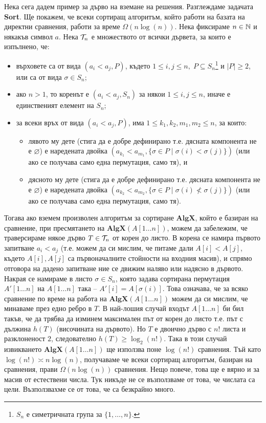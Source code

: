 Нека сега дадем пример за дърво на вземане на решения.
Разглеждаме задачата \textbf{Sort}.
Ще покажем, че всеки сортиращ алгоритъм, който работи на базата на директни сравнения, работи за време $\Omega(n \log (n))$.
Нека фиксираме $n \in \mathbb{N}$ и някакъв символ $a$.
Нека $\mathcal{T}_n$ е множеството от всички дървета, за които е изпълнено, че:
\begin{itemize}
    \item върховете са от вида $(a_i < a_j, P)$, където $1 \leq i, j \leq n, \; P \subseteq S_n$\footnote{$S_n$ е симетричната група за $\{ 1, \dots, n \}$.} и $|P| \geq 2$, или са от вида $\sigma \in S_n$;
    \item ако $n > 1$, то коренът е $(a_i < a_j, S_n)$ за някои $1 \leq i, j \leq n$, иначе е единственият елемент на $S_n$;
    \item за всеки връх от вида $(a_i < a_j, P)$, има $1 \leq k_1, k_2, m_1, m_2 \leq n$, за които:
          \begin{itemize}
              \item лявото му дете (стига да е добре дефинирано т.е. дясната компонента не е $\varnothing$) е наредената двойка $(a_{k_1} < a_{m_1}, \{ \sigma \in P \mid \sigma(i) < \sigma(j) \})$ (или ако се получава само една пермутация, само тя), и
              \item дясното му дете (стига да е добре дефинирано т.е. дясната компонента не е $\varnothing$) е наредената двойка $(a_{k_2} < a_{m_2}, \{ \sigma \in P \mid \sigma(i) \not< \sigma(j) \})$ (или ако се получава само една пермутация, само тя).
          \end{itemize}
\end{itemize}
Тогава ако вземем произволен алгоритъм за сортиране $\mathbf{AlgX}$, който е базиран на сравнение, при пресмятането на $\mathbf{AlgX}(A[1 \dots n])$, можем да забележим, че траверсираме някое дърво $T \in \mathcal{T}_n$ от корен до листо.
В корена се намира първото запитване $a_i < a_j$ (т.е. можем да си мислим, че питаме дали $A[i] < A[j]$, където $A[i], A[j]$ са първоначалните стойности на входния масив), и спрямо отговора на дадено запитване ние се движим наляво или надясно в дървото.
Накрая се намираме в листо $\sigma \in S_n$, която задава сортирана пермутация $A'[1 \dots n]$ на $A[1 \dots n]$ така -- $A'[i] = A[\sigma(i)]$.
Това означава, че за всяко сравнение по време на работа на $\mathbf{AlgX}(A[1 \dots n])$ можем да си мислим, че минаваме през едно ребро в $T$.
В най-лошия случай входът $A[1 \dots n]$ би бил такъв, че да трябва да изминем максимален път от корен до листо т.е. път с дължина $h(T)$ (височината на дървото).
Но $T$ е двоично дърво с $n!$ листа и разклоненост $2$, следователно $h(T) \geq \log_2(n!)$.
Така в този случай извикването $\mathbf{AlgX}(A[1 \dots n])$ ще използва поне $\log(n!)$ сравнения.
Тъй като $\log(n!) \asymp n \log(n)$, получаваме че всеки сортиращ алгоритъм, базиран на сравнения, прави $\Omega(n \log(n))$ сравнения.
Нещо повече, това ще е вярно и за масив от естествени числа.
Тук никъде не се възползваме от това, че числата са цели.
Възползвахме се от това, че са безкрайно много.

